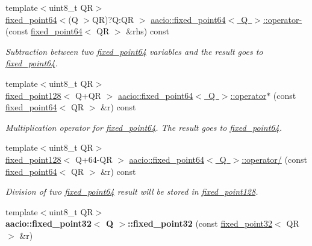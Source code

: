 \begin{DoxyCompactItemize}
{\footnotesize template$<$uint8\+\_\+t QR$>$ }\\\mbox{\hyperlink{structaacio_1_1fixed__point64}{fixed\+\_\+point64}}$<$(Q $>$QR)?Q\+:\+QR $>$ \mbox{\hyperlink{group__fixedpoint_ga4adb183ccf49ea8a378585c373b9902a}{aacio\+::fixed\+\_\+point64$<$ Q $>$\+::operator-\/}} (const \mbox{\hyperlink{structaacio_1_1fixed__point64}{fixed\+\_\+point64}}$<$ QR $>$ \&rhs) const
\begin{DoxyCompactList}\small\item\em Subtraction between two \mbox{\hyperlink{structaacio_1_1fixed__point64}{fixed\+\_\+point64}} variables and the result goes to \mbox{\hyperlink{structaacio_1_1fixed__point64}{fixed\+\_\+point64}}. \end{DoxyCompactList}\item 
{\footnotesize template$<$uint8\+\_\+t QR$>$ }\\\mbox{\hyperlink{structaacio_1_1fixed__point128}{fixed\+\_\+point128}}$<$ Q+QR $>$ \mbox{\hyperlink{group__fixedpoint_ga21d919b0487e65e733c35adb41848a34}{aacio\+::fixed\+\_\+point64$<$ Q $>$\+::operator$\ast$}} (const \mbox{\hyperlink{structaacio_1_1fixed__point64}{fixed\+\_\+point64}}$<$ QR $>$ \&r) const
\begin{DoxyCompactList}\small\item\em Multiplication operator for \mbox{\hyperlink{structaacio_1_1fixed__point64}{fixed\+\_\+point64}}. The result goes to \mbox{\hyperlink{structaacio_1_1fixed__point64}{fixed\+\_\+point64}}. \end{DoxyCompactList}\item 
{\footnotesize template$<$uint8\+\_\+t QR$>$ }\\\mbox{\hyperlink{structaacio_1_1fixed__point128}{fixed\+\_\+point128}}$<$ Q+64-\/QR $>$ \mbox{\hyperlink{group__fixedpoint_gadee229420aa1db314948b0664323ba9c}{aacio\+::fixed\+\_\+point64$<$ Q $>$\+::operator/}} (const \mbox{\hyperlink{structaacio_1_1fixed__point64}{fixed\+\_\+point64}}$<$ QR $>$ \&r) const
\begin{DoxyCompactList}\small\item\em Division of two \mbox{\hyperlink{structaacio_1_1fixed__point64}{fixed\+\_\+point64}} result will be stored in \mbox{\hyperlink{structaacio_1_1fixed__point128}{fixed\+\_\+point128}}. \end{DoxyCompactList}\item 
\mbox{\label{group__fixedpoint_gaa50e4ebdc17e64f916a014f03843c333}} 
{\footnotesize template$<$uint8\+\_\+t QR$>$ }\\{\bfseries aacio\+::fixed\+\_\+point32$<$ Q $>$\+::fixed\+\_\+point32} (const \mbox{\hyperlink{structaacio_1_1fixed__point32}{fixed\+\_\+point32}}$<$ QR $>$ \&r)

\end{DoxyCompactItemize}
